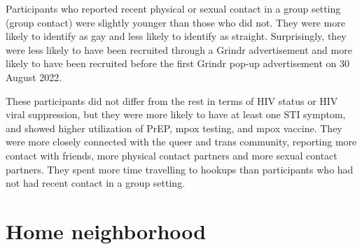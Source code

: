 \documentclass[
  letterpaper,
  DIV=11,
  numbers=noendperiod,
  oneside]{scrreprt}
\begin{document}
Participants who reported recent physical or sexual contact in a group
setting (group contact) were slightly younger than those who did not.
They were more likely to identify as gay and less likely to identify as
straight. Surprisingly, they were less likely to have been recruited
through a Grindr advertisement and more likely to have been recruited
before the first Grindr pop-up advertisement on 30 August 2022.

These participants did not differ from the rest in terms of HIV status
or HIV viral suppression, but they were more likely to have at least one
STI symptom, and showed higher utilization of PrEP, mpox testing, and
mpox vaccine. They were more closely connected with the queer and trans
community, reporting more contact with friends, more physical contact
partners and more sexual contact partners. They spent more time
travelling to hookups than participants who had not had recent contact
in a group setting.

\hypertarget{home-neighborhood}{%
\section{Home neighborhood}\label{home-neighborhood}}
\end{document}
